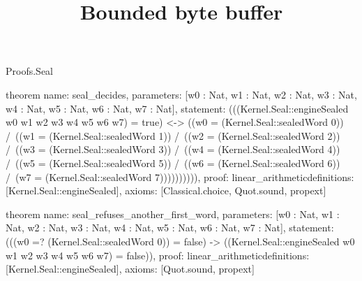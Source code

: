 \begin{lexlean}{Proofs.Seal}
\title{Bounded byte buffer}
\begin{semanticmodule}
theorem{
  name: seal_decides,
  parameters: [w0 : Nat, w1 : Nat, w2 : Nat, w3 : Nat, w4 : Nat, w5 : Nat, w6 : Nat, w7 : Nat],
  statement: (((Kernel.Seal::engineSealed w0 w1 w2 w3 w4 w5 w6 w7) = true) <-> ((w0 = (Kernel.Seal::sealedWord 0)) /\ ((w1 = (Kernel.Seal::sealedWord 1)) /\ ((w2 = (Kernel.Seal::sealedWord 2)) /\ ((w3 = (Kernel.Seal::sealedWord 3)) /\ ((w4 = (Kernel.Seal::sealedWord 4)) /\ ((w5 = (Kernel.Seal::sealedWord 5)) /\ ((w6 = (Kernel.Seal::sealedWord 6)) /\ (w7 = (Kernel.Seal::sealedWord 7)))))))))),
  proof: linear_arithmetic{definitions: [Kernel.Seal::engineSealed]},
  axioms: [Classical.choice, Quot.sound, propext]
}

theorem{
  name: seal_refuses_another_first_word,
  parameters: [w0 : Nat, w1 : Nat, w2 : Nat, w3 : Nat, w4 : Nat, w5 : Nat, w6 : Nat, w7 : Nat],
  statement: (((w0 =? (Kernel.Seal::sealedWord 0)) = false) -> ((Kernel.Seal::engineSealed w0 w1 w2 w3 w4 w5 w6 w7) = false)),
  proof: linear_arithmetic{definitions: [Kernel.Seal::engineSealed]},
  axioms: [Quot.sound, propext]
}
\end{semanticmodule}
\end{lexlean}
